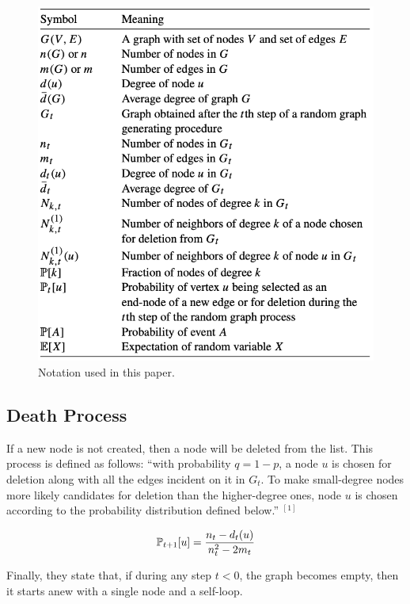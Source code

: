 \documentclass[final,3p,times,twocolumn]{elsarticle}
\begin{document}
\begin{figure}[h]
\centering\includegraphics[width=1\linewidth]{notation.png}
\caption{Notation used in this paper.}
\end{figure}

\subsection{Death Process}

If a new node is not created, then a node will be deleted from the list. This process is defined as follows: “with probability $q = 1 - p$, a node $u$ is chosen for deletion along with all the edges incident on it in $G_t$. To make small-degree nodes more likely candidates for deletion than the higher-degree ones, node $u$ is chosen according to the probability distribution defined below.” $^{[1]}$

\begin{equation}
\centering
    \mathbb{P}_{t + 1}[u] = \frac{n_t - d_t(u)}{n^2_t - 2m_t} 
\end{equation}

Finally, they state that, if during any step $t < 0$, the graph becomes empty, then it starts anew with a single node and a self-loop.
\end{document}

